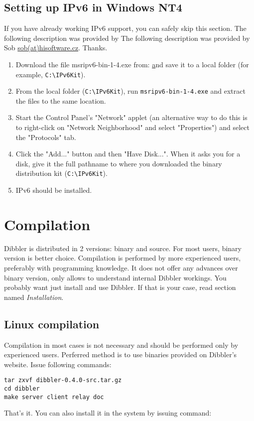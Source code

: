 \subsection{Setting up IPv6 in Windows NT4}
If you have already working IPv6 support, you can safely skip this section.
The following description was provided by The following description was provided by Sob
\href{mailto:sob(at)hisoftware.cz}{sob(at)hisoftware.cz}. Thanks.

\begin{enumerate}
  \item Download the file msripv6-bin-1-4.exe from:
    \href{http://research.microsoft.com/msripv6/msripv6.htm}
    and save it to a local folder (for example, \verb+C:\IPv6Kit+).
  \item From the local folder (\verb+C:\IPv6Kit+), run \verb+msripv6-bin-1-4.exe+ and extract the
    files to the same location.
  \item Start the Control Panel's "Network" applet (an alternative way to do this is
    to right-click on "Network Neighborhood" and select "Properties") and select
    the "Protocols" tab.
  \item Click the "Add..." button and then "Have Disk...". When it asks you for
    a disk, give it the full pathname to where you downloaded the binary
    distribution kit (\verb+C:\IPv6Kit+).
  \item IPv6 should be installed.
\end{enumerate}

\section{Compilation}
Dibbler is distributed in 2 versions: binary and source. For
most users, binary version is better choice.  Compilation is
performed by more experienced users, preferably with programming
knowledge. It does not offer any advances over binary version, only
allows to understand internal Dibbler workings. You probably want just
install and use Dibbler. If that is your case, read section
named \emph{Installation}.

\subsection{Linux compilation}

Compilation in most cases is not necessary and should be performed
only by experienced users. Perferred method is to use binaries
provided on Dibbler's website. Issue following commands:
\begin{verbatim}
tar zxvf dibbler-0.4.0-src.tar.gz
cd dibbler
make server client relay doc
\end{verbatim}
That's it. You can also install it in the system by issuing command:

